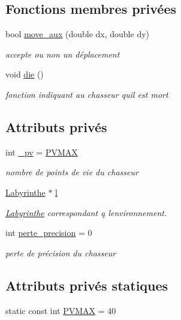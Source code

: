 \subsection*{Fonctions membres privées}
\begin{DoxyCompactItemize}
\item 
bool \hyperlink{classChasseur_aa6379811f429b4a20c60081493f1ee01}{move\+\_\+aux} (double dx, double dy)
\begin{DoxyCompactList}\small\item\em accepte ou non un déplacement \end{DoxyCompactList}\item 
void \hyperlink{classChasseur_ad618f782898a99810dae7ad8ee2c2f74}{die} ()
\begin{DoxyCompactList}\small\item\em fonction indiquant au chasseur qu\textquotesingle{}il est mort \end{DoxyCompactList}\end{DoxyCompactItemize}
\subsection*{Attributs privés}
\begin{DoxyCompactItemize}
\item 
int \hyperlink{classChasseur_a3c8f5b959145976c4d110a5a583791ab}{\+\_\+pv} = \hyperlink{classChasseur_a7b7fed3026976e62f8f730cc71c5b2db}{P\+V\+M\+AX}
\begin{DoxyCompactList}\small\item\em nombre de points de vie du chasseur \end{DoxyCompactList}\item 
\hyperlink{classLabyrinthe}{Labyrinthe} $\ast$ \hyperlink{classChasseur_a96372f6800e28733746f01393aa47ff6}{l}
\begin{DoxyCompactList}\small\item\em \hyperlink{classLabyrinthe}{Labyrinthe} correspondant ą l\textquotesingle{}environnement. \end{DoxyCompactList}\item 
int \hyperlink{classChasseur_af49bab4221ac24439c87bbda4cc9293d}{perte\+\_\+precision} = 0
\begin{DoxyCompactList}\small\item\em perte de précision du chasseur \end{DoxyCompactList}\end{DoxyCompactItemize}
\subsection*{Attributs privés statiques}
\begin{DoxyCompactItemize}
\item 
static const int \hyperlink{classChasseur_a7b7fed3026976e62f8f730cc71c5b2db}{P\+V\+M\+AX} = 40
\end{DoxyCompactItemize}
